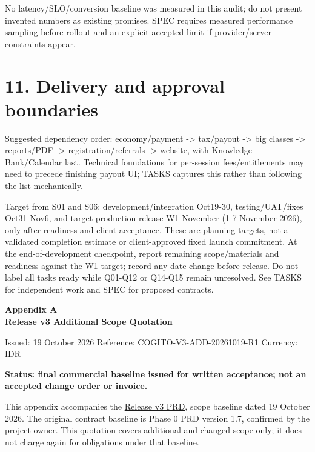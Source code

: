 \documentclass[11pt,a4paper]{article}
\begin{document}
No latency/SLO/conversion baseline was measured in this audit; do not present invented numbers as existing promises. SPEC requires measured performance sampling before rollout and an explicit accepted limit if provider/server constraints appear.

\section{11. Delivery and approval boundaries}\label{delivery-and-approval-boundaries}

Suggested dependency order: economy/payment -\textgreater{} tax/payout -\textgreater{} big classes -\textgreater{} reports/PDF -\textgreater{} registration/referrals -\textgreater{} website, with Knowledge Bank/Calendar last. Technical foundations for per-session fees/entitlements may need to precede finishing payout UI; TASKS captures this rather than following the list mechanically.

Target from S01 and S06: development/integration Oct19-30, testing/UAT/fixes Oct31-Nov6, and target production release W1 November (1-7 November 2026), only after readiness and client acceptance. These are planning targets, not a validated completion estimate or client-approved fixed launch commitment. At the end-of-development checkpoint, report remaining scope/materials and readiness against the W1 target; record any date change before release. Do not label all tasks ready while Q01-Q12 or Q14-Q15 remain unresolved. See TASKS for independent work and SPEC for proposed contracts.

\clearpage
\begin{center}
{\LARGE\textbf{Appendix A}}\\[5pt]
{\Large\textbf{Release v3 Additional Scope Quotation}}
\end{center}

Issued: 19 October 2026 \textbar{} Reference: COGITO-V3-ADD-20261019-R1 \textbar{} Currency: IDR

\textbf{Status: final commercial baseline issued for written acceptance; not an accepted change order or invoice.}

This appendix accompanies the \href{../../docs/plans/active/RELEASE-V3-PRD.md}{Release v3 PRD}, scope baseline dated 19 October 2026. The original contract baseline is Phase 0 PRD version 1.7, confirmed by the project owner. This quotation covers additional and changed scope only; it does not charge again for obligations under that baseline.
\end{document}

